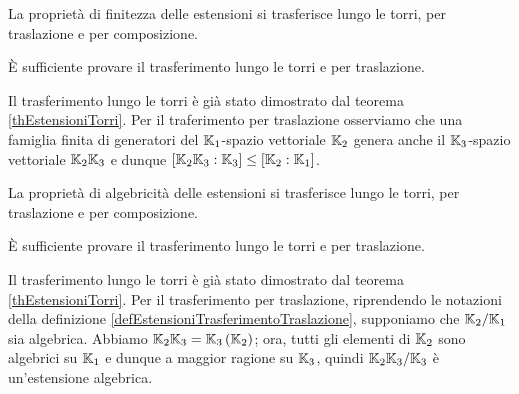 \begin{Theorem}
	La propriet\`a di finitezza delle estensioni si trasferisce lungo le torri, per traslazione e per composizione.
\end{Theorem}
\Proof \`E sufficiente provare il trasferimento lungo le torri e per traslazione.
\par Il trasferimento lungo le torri \`e gi\`a stato dimostrato dal teorema \ref{thEstensioniTorri}. Per il traferimento per traslazione osserviamo che una famiglia finita di generatori del $\mathbb{K}_1$-spazio vettoriale $\mathbb{K}_2$ genera anche il $\mathbb{K}_3$-spazio vettoriale $\mathbb{K}_2\mathbb{K}_3$ e dunque $[\mathbb{K}_2\mathbb{K}_3:\mathbb{K}_3] \leq [\mathbb{K}_2:\mathbb{K}_1]$. \EndProof
\begin{Theorem}
	La propriet\`a di algebricit\`a delle estensioni si trasferisce lungo le torri, per traslazione e per composizione.
\end{Theorem}
\Proof \`E sufficiente provare il trasferimento lungo le torri e per traslazione.
\par Il trasferimento lungo le torri \`e gi\`a stato dimostrato dal teorema \ref{thEstensioniTorri}. Per il trasferimento per traslazione, riprendendo le notazioni della definizione \ref{defEstensioniTrasferimentoTraslazione}, supponiamo che $\mathbb{K}_2/\mathbb{K}_1$ sia algebrica. Abbiamo $\mathbb{K}_2\mathbb{K}_3 = \mathbb{K}_3 \left ( \mathbb{K}_2 \right )$; ora, tutti gli elementi di $\mathbb{K}_2$ sono algebrici su $\mathbb{K}_1$ e dunque a maggior ragione su $\mathbb{K}_3$, quindi $\mathbb{K}_2\mathbb{K}_3/\mathbb{K}_3$ \`e un'estensione algebrica. \EndProof
